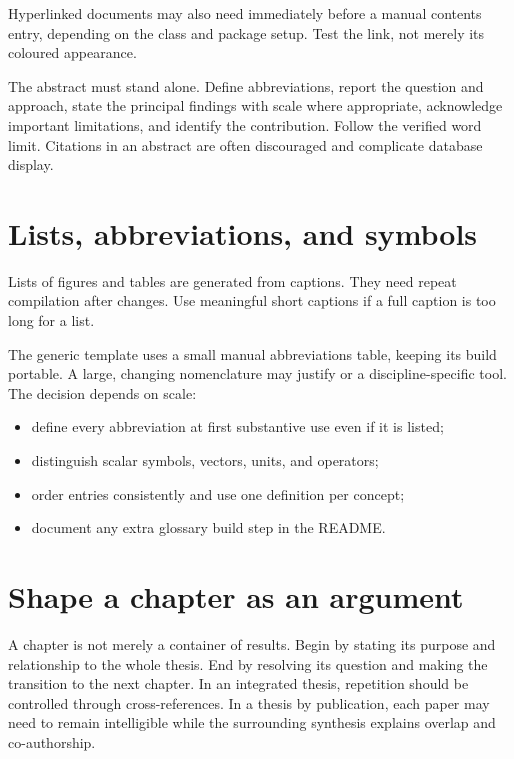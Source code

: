 Hyperlinked documents may also need  immediately before a
manual contents entry, depending on the class and package setup. Test the link,
not merely its coloured appearance.

The abstract must stand alone. Define abbreviations, report the question and
approach, state the principal findings with scale where appropriate, acknowledge
important limitations, and identify the contribution. Follow the verified word
limit. Citations in an abstract are often discouraged and complicate database
display.

\section{Lists, abbreviations, and symbols}

Lists of figures and tables are generated from captions. They need repeat
compilation after changes. Use meaningful short captions if a full caption is
too long for a list.

The generic template uses a small manual abbreviations table, keeping its build
portable. A large, changing nomenclature may justify  or a
discipline-specific tool. The decision depends on scale:

\begin{itemize}
  \item define every abbreviation at first substantive use even if it is listed;
  \item distinguish scalar symbols, vectors, units, and operators;
  \item order entries consistently and use one definition per concept;
  \item document any extra glossary build step in the README.
\end{itemize}

\section{Shape a chapter as an argument}

A chapter is not merely a container of results. Begin by stating its purpose
and relationship to the whole thesis. End by resolving its question and making
the transition to the next chapter. In an integrated thesis, repetition should
be controlled through cross-references. In a thesis by publication, each paper
may need to remain intelligible while the surrounding synthesis explains
overlap and co-authorship.

